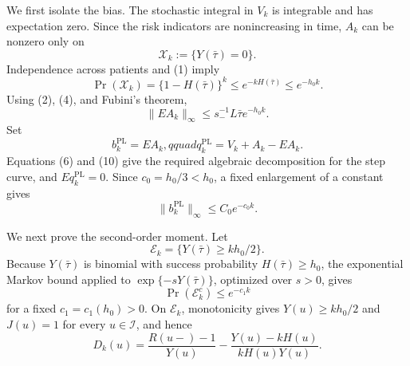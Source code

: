 We first isolate the bias.  The stochastic integral in \(V_k\) is integrable and has expectation zero.  Since the risk indicators are nonincreasing in time, \(A_k\) can be nonzero only on
\[
 \mathcal X_k:=\{Y(\bar\tau)=0\}.
\]
Independence across patients and (1) imply
\[
 \Pr(\mathcal X_k)=\{1-H(\bar\tau)\}^k
 \le e^{-kH(\bar\tau)}\le e^{-h_0k}.                         \tag{8}
\]
Using (2), (4), and Fubini's theorem,
\[
 \|EA_k\|_\infty
 \le s_-^{-1}L\bar\tau e^{-h_0k}.                            \tag{9}
\]
Set
\[
 b_k^{\mathrm{PL}}=EA_k,qquad
 q_k^{\mathrm{PL}}=V_k+A_k-EA_k.                             \tag{10}
\]
Equations (6) and (10) give the required algebraic decomposition for the step curve, and \(Eq_k^{\mathrm{PL}}=0\).  Since \(c_0=h_0/3<h_0\), a fixed enlargement of a constant gives
\[
 \|b_k^{\mathrm{PL}}\|_\infty\le C_0e^{-c_0k}.             \tag{11}
\]

We next prove the second-order moment.  Let
\[
 \mathcal E_k=\{Y(\bar\tau)\ge kh_0/2\}.
\]
Because \(Y(\bar\tau)\) is binomial with success probability \(H(\bar\tau)\ge h_0\), the exponential Markov bound applied to \(\exp\{-sY(\bar\tau)\}\), optimized over \(s>0\), gives
\[
 \Pr(\mathcal E_k^c)\le e^{-c_1k}                            \tag{12}
\]
for a fixed \(c_1=c_1(h_0)>0\).  On \(\mathcal E_k\), monotonicity gives \(Y(u)\ge kh_0/2\) and \(J(u)=1\) for every \(u\in\mathcal I\), and hence
\[
 D_k(u)=\frac{R(u-)-1}{Y(u)}
 -\frac{Y(u)-kH(u)}{kH(u)Y(u)}.                              \tag{13}
\]

